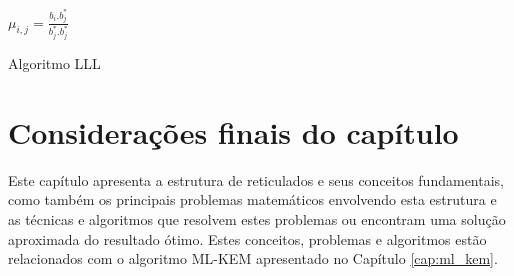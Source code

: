         \begin{algorithm}[!htbp]
            \SetAlgoLined
            $\mu_{i,j} = \frac{b_i.b_{j}^{*}}{b_{j}^{*}.b_{j}^{*}}$\\
            \caption{Algoritmo LLL}
            \label{algo:lll}
        \end{algorithm}

\section{Considerações finais do capítulo}
    Este capítulo apresenta a estrutura de reticulados e seus conceitos fundamentais, como também os principais problemas matemáticos envolvendo esta estrutura e as técnicas e algoritmos que resolvem estes problemas ou encontram uma solução aproximada do resultado ótimo. Estes conceitos, problemas e algoritmos estão relacionados com o algoritmo \ac{ML-KEM} apresentado no Capítulo \ref{cap:ml_kem}.